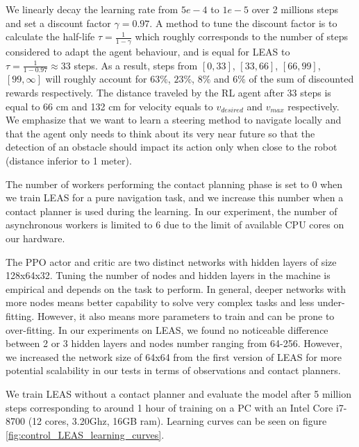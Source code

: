 We linearly decay the learning rate from $5e-4$ to $1e-5$ over 2 millions steps and set a discount factor $\gamma = 0.97$. 
A method to tune the discount factor is to calculate the half-life $\tau = \frac{1}{1-\gamma}$ which roughly corresponds to the number of steps considered to adapt the agent behaviour, and is equal for LEAS to $\tau = \frac{1}{1-0.97} \approx 33$ steps. 
As a result, steps from $[0,33]$, $[33,66]$, $[66,99]$, $[99,\infty]$ will roughly account for $63\%$, $23\%$, $8\%$ and $6\%$ of the sum of discounted rewards respectively. 
The distance traveled by the RL agent after 33 steps is equal to 66 cm and 132 cm for velocity equals to $v_{desired}$ and $v_{max}$ respectively.
We emphasize that we want to learn a steering method to navigate locally and that the agent only needs to think about its very near future so that the detection of an obstacle should impact its action only when close to the robot (distance inferior to 1 meter).

The number of workers performing the contact planning phase is set to 0 when we train LEAS for a pure navigation task, and we increase this number when a contact planner is used during the learning. In our experiment, the number of asynchronous workers is limited to 6 due to the limit of available CPU cores on our hardware.

The PPO actor and critic are two distinct networks with hidden layers of size 128x64x32. Tuning the number of nodes and hidden layers in the machine is empirical and depends on the task to perform. In general, deeper networks with more nodes means better capability to solve very complex tasks and less under-fitting. However, it also means more parameters to train and can be prone to over-fitting. In our experiments on LEAS, we found no noticeable difference between 2 or 3 hidden layers and nodes number ranging from 64-256. However, we increased the network size of 64x64 from the first version of LEAS \cite{LEAS} for more potential scalability in our tests in terms of observations and contact planners.

We train LEAS without a contact planner and evaluate the model after 5 million steps corresponding to around 1 hour of training on a PC with an Intel Core i7-8700 (12 cores, 3.20Ghz, 16GB ram). Learning curves can be seen on figure \ref{fig:control_LEAS_learning_curves}.

